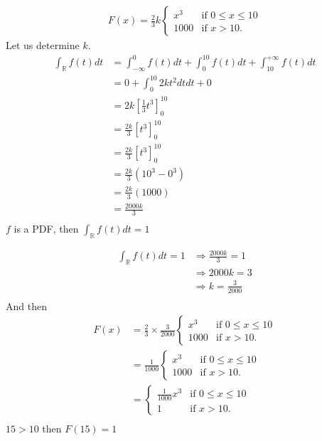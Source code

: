 \documentclass[11pt]{article}
\def\gt{>}
\begin{document}
\begin{align*}
F(x) = \frac{2}{3}k\begin{cases}
            x^3 & \text{if } 0 \leq x \leq 10 \\
            1000 & \text{if } x \gt 10.
        \end{cases}
\end{align*}
Let us determine $k$.
\begin{align*}
\int_\mathbb{R} f(t)dt &=\int_\mathbb{-\infty}^0 f(t)dt + \int_0^{10} f(t)dt +\int_{10}^{+\infty} f(t)dt\\
				  &=0+ \int_0^{10} 2kt^2dtdt+0\\
				  &=2k[\frac{1}{3}t^3]_0^{10}\\
				  				  								  &=\frac{2k}{3}[t^3]_0^{10}\\
				  				  								  &=\frac{2k}{3}[t^3]_0^{10}\\
				  				  								  &=\frac{2k}{3}(10^3-0^3)\\
				  				  								  &=\frac{2k}{3}(1000)\\
				  				  								  &=\frac{2000k}{3}\\
\end{align*}
$f$ is a PDF, then $\int_\mathbb{R} f(t)dt=1$

 \begin{align*}
  \int_\mathbb{R} f(t)dt=1 & \Rightarrow \frac{2000k}{3} =1\\ 
 			 &\Rightarrow 2000k=3\\
 			 &\Rightarrow k=\frac{3}{2000}\\  
\end{align*}
And then
\begin{align*}
F(x) &= \frac{2}{3}\times \frac{3}{2000} \begin{cases}
            x^3 & \text{if } 0 \leq x \leq 10 \\
            1000 & \text{if } x \gt 10.
        \end{cases}\\
        &=\frac{1}{1000} \begin{cases}
            x^3 & \text{if } 0 \leq x \leq 10 \\
            1000 & \text{if } x \gt 10.
        \end{cases}\\
         &= \begin{cases}
            \frac{1}{1000}x^3 & \text{if } 0 \leq x \leq 10 \\
            1 & \text{if } x \gt 10.
        \end{cases}\\        
\end{align*}
$15 \gt 10 $ then $F(15)=1$
\end{document}

